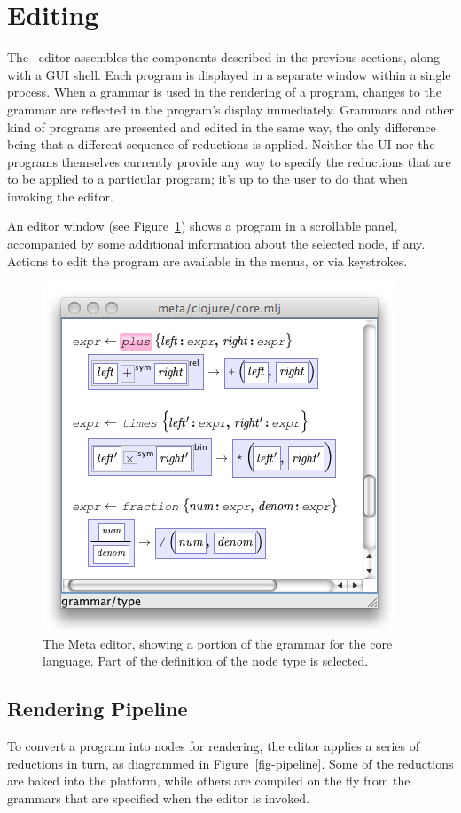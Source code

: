 %
%
\section{Editing}
The \Meta\ editor assembles the components described in the previous sections, along with a GUI shell. Each program is displayed in a separate window within a single process. When a grammar is used in the rendering of a program, changes to the grammar are reflected in the program's display immediately. Grammars and other kind of programs are presented and edited in the same way, the only difference being that a different sequence of reductions is applied. Neither the UI nor the programs themselves currently provide any way to specify the reductions that are to be applied to a particular program; it's up to the user to do that when invoking the editor.

An editor window (see Figure\ \ref{fig-editor}) shows a program in a scrollable panel, accompanied by some additional information about the selected node, if any. Actions to edit the program are available in the menus, or via keystrokes.

\begin{figure}[ht]
  \includegraphics[scale=0.60]{src/image/editor.png}
  \caption{\label{fig-editor} The Meta editor, showing a portion of the grammar for the core language. Part of the definition of the  node type is selected.}
\end{figure}


\subsection{Rendering Pipeline}
To convert a program into  nodes for rendering, the editor applies a series of reductions in turn, as diagrammed in Figure~\ref{fig-pipeline}. Some of the reductions are baked into the platform, while others are compiled on the fly from the grammars that are specified when the editor is invoked. 

